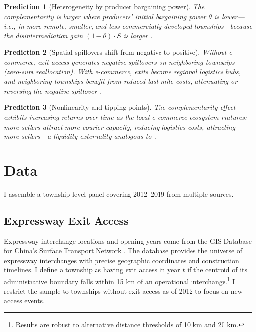 \documentclass[12pt]{article}
\newtheorem{prediction}{Prediction}
\begin{document}
\begin{prediction}[Heterogeneity by producer bargaining power]\label{pred:bargaining}
The complementarity is larger where producers' initial bargaining power $\theta$ is lower---i.e., in more remote, smaller, and less commercially developed townships---because the disintermediation gain $(1-\theta) \cdot S$ is larger \citep{hendershott2015}.
\end{prediction}

\begin{prediction}[Spatial spillovers shift from negative to positive]\label{pred:spillover}
Without e-commerce, exit access generates negative spillovers on neighboring townships (zero-sum reallocation). With e-commerce, exits become regional logistics hubs, and neighboring townships benefit from reduced last-mile costs, attenuating or reversing the negative spillover \citep{pagano1989}.
\end{prediction}

\begin{prediction}[Nonlinearity and tipping points]\label{pred:tipping}
The complementarity effect exhibits increasing returns over time as the local e-commerce ecosystem matures: more sellers attract more courier capacity, reducing logistics costs, attracting more sellers---a liquidity externality analogous to \citet{pagano1989}.
\end{prediction}


\section{Data}\label{sec:data}

I assemble a township-level panel covering 2012--2019 from multiple sources.

\subsection{Expressway Exit Access}

Expressway interchange locations and opening years come from the GIS Database for China's Surface Transport Network \citep{davis2025}. The database provides the universe of expressway interchanges with precise geographic coordinates and construction timelines. I define a township as having exit access in year $t$ if the centroid of its administrative boundary falls within 15 km of an operational interchange.\footnote{Results are robust to alternative distance thresholds of 10 km and 20 km.} I restrict the sample to townships without exit access as of 2012 to focus on new access events.
\end{document}
